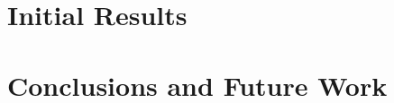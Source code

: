 \documentclass{sig-alternate}
\begin{document}
\section{Initial Results}

\section{Conclusions and Future Work}



\end{document}
